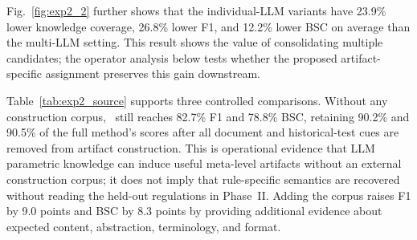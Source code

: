 Fig.~\ref{fig:exp2_2} further shows that the individual-LLM variants have
23.9\% lower knowledge coverage, 26.8\% lower F1, and 12.2\% lower BSC on
average than the multi-LLM setting. This result shows the value of
consolidating multiple candidates; the operator analysis below tests whether
the proposed artifact-specific assignment preserves this gain downstream.

\begin{table}[!t]
    \setlength{\tabcolsep}{5pt}
    \caption{Construction-source analysis on the six financial datasets. Each fidelity or coverage cell reports mean $\pm$ run-level standard deviation; within each run, results are macro-averaged across the six datasets and three LLM backends. Human effort measures the total person-hours required to construct and reconcile the knowledge artifacts and excludes downstream generation time.}
    \label{tab:exp2_source}
    \centering
\end{table}

Table~\ref{tab:exp2_source} supports three controlled comparisons.
Without any construction corpus, \ourtool\ still reaches 82.7\% F1 and 78.8\%
BSC, retaining 90.2\% and 90.5\% of the full method's scores after all document
and historical-test cues are removed from artifact construction. This is
operational evidence that LLM parametric knowledge can induce useful
meta-level artifacts without an external construction corpus; it does not
imply that rule-specific semantics are recovered without reading the held-out
regulations in Phase~II. Adding the corpus raises F1 by 9.0 points and BSC by
8.3 points by providing additional evidence about expected content,
abstraction, terminology, and format.

